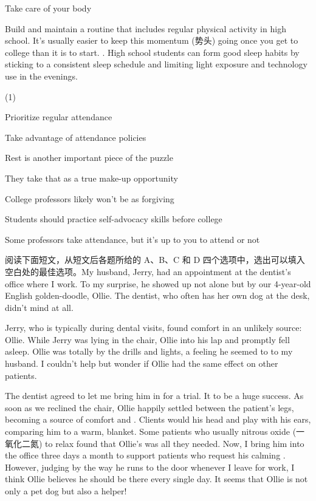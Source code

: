 \documentclass{英语试卷}
\begin{document}
\par Take care of your body\par
\par Build and maintain a routine that includes regular physical activity in high school. It's usually easier to keep this momentum (势头) going once you get to college than it is to start. . High school students can form good sleep habits by sticking to a consistent sleep schedule and limiting light exposure and technology use in the evenings.\par
\begin{choices}(1)
  \item Prioritize regular attendance
  \item Take advantage of attendance policies
  \item Rest is another important piece of the puzzle
  \item They take that as a true make-up opportunity
  \item College professors likely won't be as forgiving
  \item Students should practice self-advocacy skills before college
  \item Some professors take attendance, but it's up to you to attend or not
\end{choices}
\par 阅读下面短文，从短文后各题所给的 A、B、C 和 D 四个选项中，选出可以填入空白处的最佳选项。My husband, Jerry, had an appointment at the dentist's office where I work. To my surprise, he showed up not alone but  by our 4-year-old English golden-doodle, Ollie. The dentist, who often has her own dog  at the desk, didn't mind at all.\par
\par Jerry, who is typically  during dental visits, found comfort in an unlikely source: Ollie. While Jerry was lying in the chair, Ollie  into his lap and promptly fell asleep. Ollie was totally  by the drills and lights, a feeling he seemed to  to my husband. I couldn't help but wonder if Ollie had the same  effect on other patients.\par
\par The dentist agreed to let me bring him in for a trial. It  to be a huge success. As soon as we reclined the chair, Ollie happily settled between the patient's legs, becoming a source of comfort and . Clients would  his head and play with his ears, comparing him to a warm,  blanket. Some patients who usually  nitrous oxide (一氧化二氮) to relax found that Ollie's  was all they needed. Now, I bring him into the office three days a month to support patients who request his calming . However, judging by the way he  runs to the door whenever I leave for work, I think Ollie believes he should be there every single day. It seems that Ollie is not only a pet dog but also a helper!\par
\end{document}
